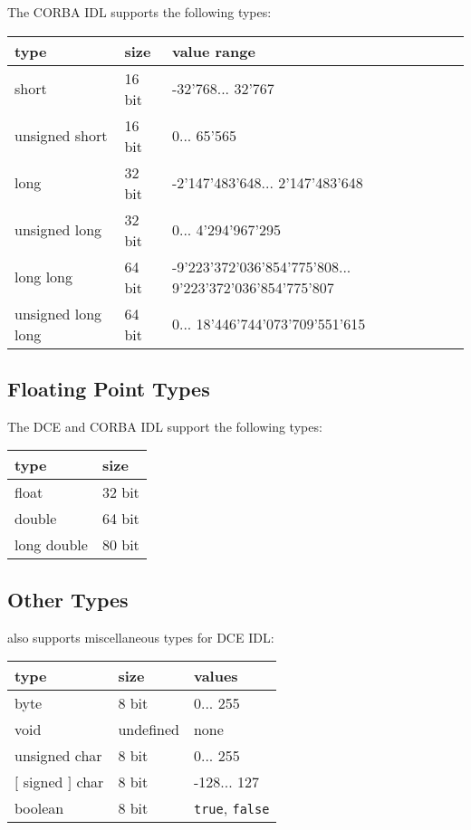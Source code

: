 The CORBA IDL supports the following types:

\begin{center}
\begin{tabular}{|l|l|p{5cm}|}
\hline
type & size & value range \\ \hline
short & 16 bit & -32'768... 32'767 \\
unsigned short & 16 bit & 0... 65'565 \\
long & 32 bit & -2'147'483'648... 2'147'483'648 \\
unsigned long & 32 bit & 0... 4'294'967'295 \\
long long & 64 bit & -9'223'372'036'854'775'808... 9'223'372'036'854'775'807 \\
unsigned long long & 64 bit & 0... 18'446'744'073'709'551'615 \\
\hline
\end{tabular}
\end{center}

\subsection{Floating Point Types}
The DCE and CORBA IDL support the following types:


\begin{center}
\begin{tabular}{|l|l|}
\hline
type & size \\ \hline
float & 32 bit \\
double & 64 bit \\
long double & 80 bit \\
\hline
\end{tabular}
\end{center}

\subsection{Other Types}

\dice{} also supports miscellaneous types for DCE IDL:

\begin{center}
\begin{tabular}{|l|l|l|}
\hline
type & size & values \\
\hline
byte & 8 bit & 0... 255 \\
void & undefined & none \\
unsigned char & 8 bit & 0... 255 \\
$[$ signed $]$ char & 8 bit & -128... 127 \\
boolean & 8 bit & {\tt true}, {\tt false} \\
\hline
\end{tabular}
\end{center}

